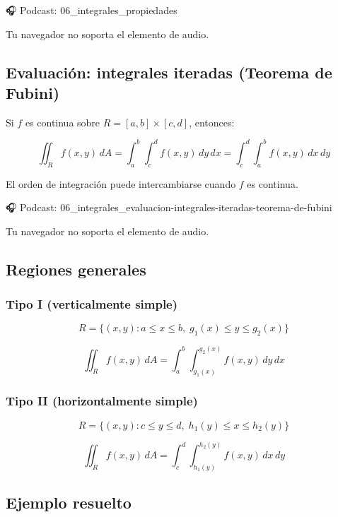 \documentclass[
]{book}
\begin{document}
🎧 Podcast: 06\_integrales\_propiedades

Tu navegador no soporta el elemento de audio.

\subsection{Evaluación: integrales iteradas (Teorema de Fubini)}\label{evaluaciuxf3n-integrales-iteradas-teorema-de-fubini}

Si \(f\) es continua sobre \(R = [a, b] \times [c, d]\), entonces:

\[
\iint_R f(x, y) \, dA = \int_a^b \int_c^d f(x, y) \, dy \, dx = \int_c^d \int_a^b f(x, y) \, dx \, dy
\]

El orden de integración puede intercambiarse cuando \(f\) es continua.

🎧 Podcast: 06\_integrales\_evaluacion-integrales-iteradas-teorema-de-fubini

Tu navegador no soporta el elemento de audio.

\subsection{Regiones generales}\label{regiones-generales}

\subsubsection{Tipo I (verticalmente simple)}\label{tipo-i-verticalmente-simple}

\[
R = \{(x, y) : a \leq x \leq b, \; g_1(x) \leq y \leq g_2(x)\}
\]

\[
\iint_R f(x, y) \, dA = \int_a^b \int_{g_1(x)}^{g_2(x)} f(x, y) \, dy \, dx
\]

\subsubsection{Tipo II (horizontalmente simple)}\label{tipo-ii-horizontalmente-simple}

\[
R = \{(x, y) : c \leq y \leq d, \; h_1(y) \leq x \leq h_2(y)\}
\]

\[
\iint_R f(x, y) \, dA = \int_c^d \int_{h_1(y)}^{h_2(y)} f(x, y) \, dx \, dy
\]

\subsection{Ejemplo resuelto}\label{ejemplo-resuelto-22}
\end{document}
